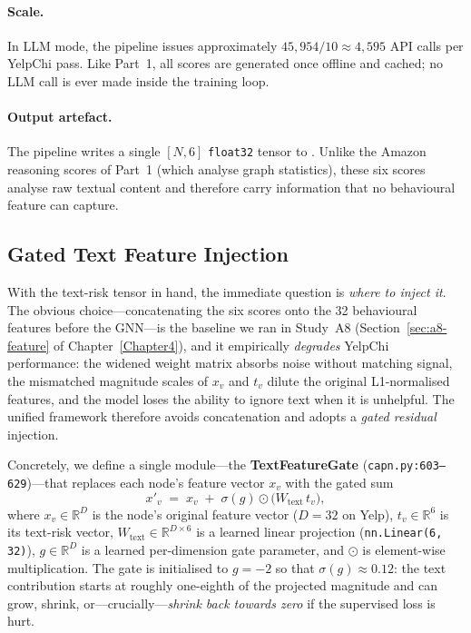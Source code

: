 \paragraph{Scale.} In LLM mode, the pipeline issues approximately $45{,}954 / 10 \approx 4{,}595$ API calls per YelpChi pass. Like Part~1, all scores are generated once offline and cached; no LLM call is ever made inside the training loop.

\paragraph{Output artefact.} The pipeline writes a single $[N, 6]$ \texttt{float32} tensor to . Unlike the Amazon reasoning scores of Part~1 (which analyse graph statistics), these six scores analyse raw textual content and therefore carry information that no behavioural feature can capture.

\subsection{Gated Text Feature Injection}
\label{sec:text-feature-gate}

With the text-risk tensor in hand, the immediate question is \emph{where to inject it}. The obvious choice---concatenating the six scores onto the 32 behavioural features before the GNN---is the baseline we ran in Study~A8 (Section~\ref{sec:a8-feature} of Chapter~\ref{Chapter4}), and it empirically \emph{degrades} YelpChi performance: the widened weight matrix absorbs noise without matching signal, the mismatched magnitude scales of $x_v$ and $t_v$ dilute the original L1-normalised features, and the model loses the ability to ignore text when it is unhelpful. The unified framework therefore avoids concatenation and adopts a \emph{gated residual} injection.

Concretely, we define a single module---the \textbf{TextFeatureGate} (\texttt{capn.py:603--629})---that replaces each node's feature vector $x_v$ with the gated sum
\begin{equation}
    x'_v \;=\; x_v \;+\; \sigma(g) \odot \bigl( W_{\text{text}} \, t_v \bigr),
    \label{eq:text-feature-gate}
\end{equation}
where $x_v \in \mathbb{R}^{D}$ is the node's original feature vector ($D=32$ on Yelp), $t_v \in \mathbb{R}^{6}$ is its text-risk vector, $W_{\text{text}} \in \mathbb{R}^{D \times 6}$ is a learned linear projection (\texttt{nn.Linear(6, 32)}), $g \in \mathbb{R}^{D}$ is a learned per-dimension gate parameter, and $\odot$ is element-wise multiplication. The gate is initialised to $g = -2$ so that $\sigma(g) \approx 0.12$: the text contribution starts at roughly one-eighth of the projected magnitude and can grow, shrink, or---crucially---\emph{shrink back towards zero} if the supervised loss is hurt.

